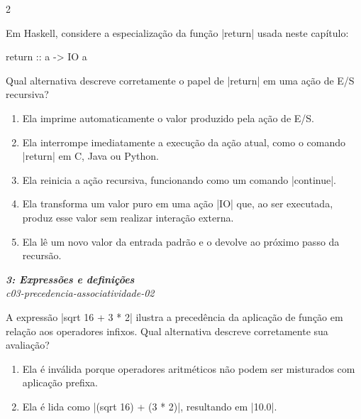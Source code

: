 \documentclass[a4paper,10pt,brazil]{article}
\begin{document}
\begin{multicols}{2}
\begin{flushright}
\end{flushright}
Em Haskell, considere a especialização da função \haskellinline|return| usada neste capítulo:

\begin{haskellcode}
return :: a -> IO a
\end{haskellcode}

Qual alternativa descreve corretamente o papel de \haskellinline|return| em uma ação de E/S recursiva?

\begin{enumerate}
  \item Ela imprime automaticamente o valor produzido pela ação de E/S.

  \item Ela interrompe imediatamente a execução da ação atual, como o comando \haskellinline|return| em C, Java ou Python.

  \item Ela reinicia a ação recursiva, funcionando como um comando \haskellinline|continue|.

  \item Ela transforma um valor puro em uma ação \haskellinline|IO| que, ao ser executada, produz esse valor sem realizar interação externa.

  \item Ela lê um novo valor da entrada padrão e o devolve ao próximo passo da recursão.


\end{enumerate}

\begin{flushright}
  \footnotesize
  \textit{\textbf{3: Expressões e definições}}\\
  \textit{c03-precedencia-associatividade-02}\\

\end{flushright}
A expressão \haskellinline|sqrt 16 + 3 * 2| ilustra a precedência da aplicação de função em relação aos operadores infixos. Qual alternativa descreve corretamente sua avaliação?

\begin{enumerate}
  \item Ela é inválida porque operadores aritméticos não podem ser misturados com aplicação prefixa.

  \item Ela é lida como \haskellinline|(sqrt 16) + (3 * 2)|, resultando em \haskellinline|10.0|.


\end{enumerate}
\end{multicols}
\end{document}
